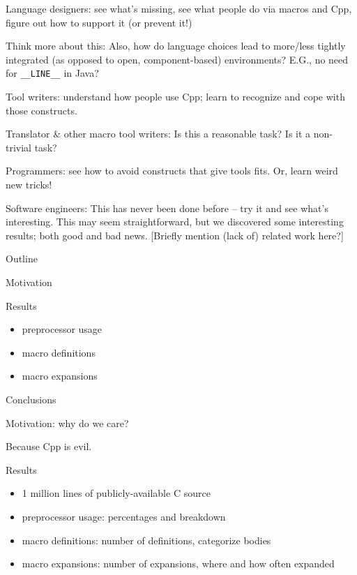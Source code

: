\documentclass{slides}
\def\slidetitle#1{\begin{center}\large #1 \end{center}}
\def\slbreak{\\ \strut\hspace{1em}}
\begin{document}
\begin{note}
Language designers: see what's missing, see what people do via macros and
Cpp, figure out how to support it (or prevent it!) \slbreak
Think more about this:  Also, how do language choices lead to more/less
tightly integrated (as opposed to open, component-based) environments?
E.G., no need for \verb|__LINE__| in Java?

Tool writers: understand how people use Cpp; learn to recognize and cope
with those constructs. \slbreak
Translator \& other macro tool writers:  Is this a reasonable task?  Is it a
non-trivial task?

Programmers: see how to avoid constructs that give tools fits.  Or, learn
weird new tricks!

Software engineers: This has never been done before -- try it and see
what's interesting.  This may seem straightforward, but we discovered some
interesting results; both good and bad news.  [Briefly mention (lack of)
related work here?]
\end{note}


\def\outlineslidebody{
  \slidetitle{Outline}

  Motivation

  Results
  \vspace{-.5in}
  \begin{itemize}\itemsep 0pt \parskip 0pt
  \item preprocessor usage
  \item macro definitions
  \item macro expansions
  \end{itemize}

  Conclusions
}

\begin{slide}
\outlineslidebody
\end{slide}

\begin{note}

Motivation:  why do we care? \slbreak
Because Cpp is evil.

Results
\vspace{-.5in}
\begin{itemize}\itemsep 0pt \parskip 0pt
\item 1 million lines of publicly-available C source
\item preprocessor usage: percentages and breakdown
\item macro definitions: number of definitions, categorize bodies
\item macro expansions: number of expansions, where and how often expanded
\end{itemize}

\end{note}
\end{document}
